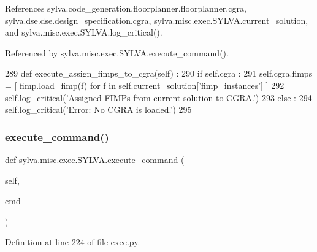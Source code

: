 References sylva.\+code\+\_\+generation.\+floorplanner.\+floorplanner.\+cgra, sylva.\+dse.\+dse.\+design\+\_\+specification.\+cgra, sylva.\+misc.\+exec.\+S\+Y\+L\+V\+A.\+current\+\_\+solution, and sylva.\+misc.\+exec.\+S\+Y\+L\+V\+A.\+log\+\_\+critical().



Referenced by sylva.\+misc.\+exec.\+S\+Y\+L\+V\+A.\+execute\+\_\+command().


\begin{DoxyCode}
289   \textcolor{keyword}{def }execute\_assign\_fimps\_to\_cgra(self) :
290     \textcolor{keywordflow}{if} self.cgra :
291       self.cgra.fimps = [ fimp.load\_fimp(f) \textcolor{keywordflow}{for} f \textcolor{keywordflow}{in} self.current\_solution[\textcolor{stringliteral}{'fimp\_instances'}] ]
292       self.log\_critical(\textcolor{stringliteral}{'Assigned FIMPs from current solution to CGRA.'})
293     \textcolor{keywordflow}{else} :
294       self.log\_critical(\textcolor{stringliteral}{'Error: No CGRA is loaded.'})
295 
\end{DoxyCode}
\mbox{\label{classsylva_1_1misc_1_1exec_1_1_s_y_l_v_a_a6e8ae0e377770a6669d6c9544b7b55db}} 
\subsubsection{\texorpdfstring{execute\+\_\+command()}{execute\_command()}}
{\footnotesize\ttfamily def sylva.\+misc.\+exec.\+S\+Y\+L\+V\+A.\+execute\+\_\+command (\begin{DoxyParamCaption}\item[{}]{self,  }\item[{}]{cmd }\end{DoxyParamCaption})}



Definition at line 224 of file exec.\+py.



